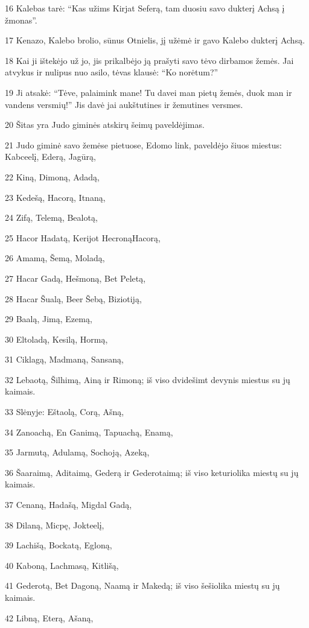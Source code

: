 \par 16 Kalebas tarė: “Kas užims Kirjat Seferą, tam duosiu savo dukterį Achsą į žmonas”. 
\par 17 Kenazo, Kalebo brolio, sūnus Otnielis, jį užėmė ir gavo Kalebo dukterį Achsą. 
\par 18 Kai ji ištekėjo už jo, jis prikalbėjo ją prašyti savo tėvo dirbamos žemės. Jai atvykus ir nulipus nuo asilo, tėvas klausė: “Ko norėtum?” 
\par 19 Ji atsakė: “Tėve, palaimink mane! Tu davei man pietų žemės, duok man ir vandens versmių!” Jis davė jai aukštutines ir žemutines versmes. 
\par 20 Šitas yra Judo giminės atskirų šeimų paveldėjimas. 
\par 21 Judo giminė savo žemėse pietuose, Edomo link, paveldėjo šiuos miestus: Kabceelį, Ederą, Jagūrą, 
\par 22 Kiną, Dimoną, Adadą, 
\par 23 Kedešą, Hacorą, Itnaną, 
\par 24 Zifą, Telemą, Bealotą, 
\par 25 Hacor Hadatą, Kerijot Hecroną­Hacorą, 
\par 26 Amamą, Šemą, Moladą, 
\par 27 Hacar Gadą, Hešmoną, Bet Peletą, 
\par 28 Hacar Šualą, Beer Šebą, Biziotiją, 
\par 29 Baalą, Jimą, Ezemą, 
\par 30 Eltoladą, Kesilą, Hormą, 
\par 31 Ciklagą, Madmaną, Sansaną, 
\par 32 Lebaotą, Šilhimą, Ainą ir Rimoną; iš viso dvidešimt devynis miestus su jų kaimais. 
\par 33 Slėnyje: Eštaolą, Corą, Ašną, 
\par 34 Zanoachą, En Ganimą, Tapuachą, Enamą, 
\par 35 Jarmutą, Adulamą, Sochoją, Azeką, 
\par 36 Šaaraimą, Aditaimą, Gederą ir Gederotaimą; iš viso keturiolika miestų su jų kaimais. 
\par 37 Cenaną, Hadašą, Migdal Gadą, 
\par 38 Dilaną, Micpę, Jokteelį, 
\par 39 Lachišą, Bockatą, Egloną, 
\par 40 Kaboną, Lachmasą, Kitlišą, 
\par 41 Gederotą, Bet Dagoną, Naamą ir Makedą; iš viso šešiolika miestų su jų kaimais. 
\par 42 Libną, Eterą, Ašaną, 

